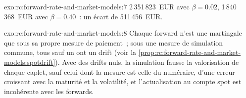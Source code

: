 \begin{solution}{exo:rc:forward-rate-and-market-models:7}
2\,351\,823~EUR avec $\beta=0.02$, 1\,840\,368~EUR avec $\beta=0.40$~: un écart de
511\,456~EUR.
\end{solution}

\begin{solution}{exo:rc:forward-rate-and-market-models:8}
Chaque forward n'est une martingale que sous sa propre mesure de paiement~; sous une
mesure de simulation commune, tous sauf un ont un drift
(voir la \cref{prop:rc:forward-rate-and-market-models:spotdrift}). Avec des drifts nuls, la
simulation fausse la valorisation de chaque caplet, sauf celui dont la mesure est
celle du numéraire, d'une erreur croissant avec la maturité et la volatilité, et
l'actualisation au compte spot est incohérente avec les forwards.
\end{solution}

